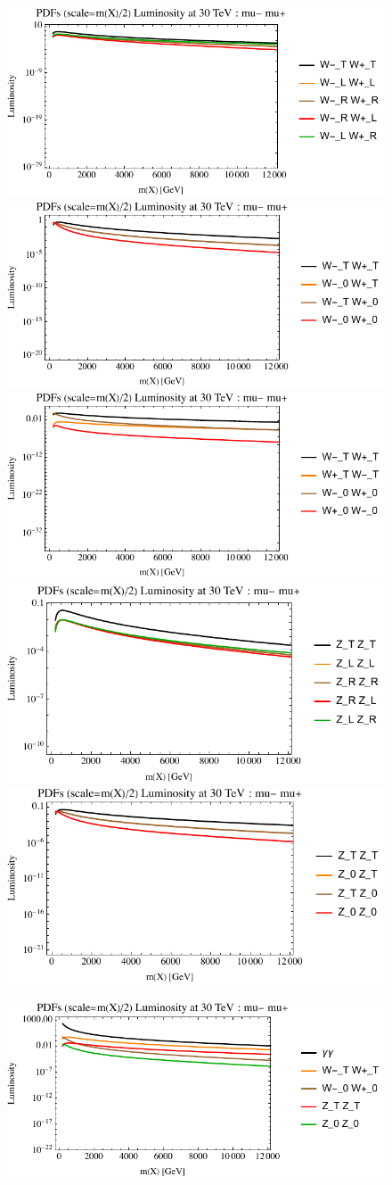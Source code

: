 \documentclass[a4paper,11pt]{article}
\begin{document}
\begin{figure}[ht]
\includegraphics[width=0.4\linewidth]{PlotLumi/30TeV/lumis/plotWWpolRandL.pdf}
\includegraphics[width=0.4\linewidth]{PlotLumi/30TeV/lumis/plotWWpolTand0.pdf}
\includegraphics[width=0.4\linewidth]{PlotLumi/30TeV/lumis/plotWmWpandWpWm.pdf}
\includegraphics[width=0.4\linewidth]{PlotLumi/30TeV/lumis/plotZZpolRandL.pdf}
\includegraphics[width=0.4\linewidth]{PlotLumi/30TeV/lumis/plotZZpolTand0.pdf}
\end{figure}

\begin{figure}
\includegraphics[width=0.4\linewidth]{PlotLumi/30TeV/lumis/plotgammaWZ.pdf}
\end{figure}
\end{document}
